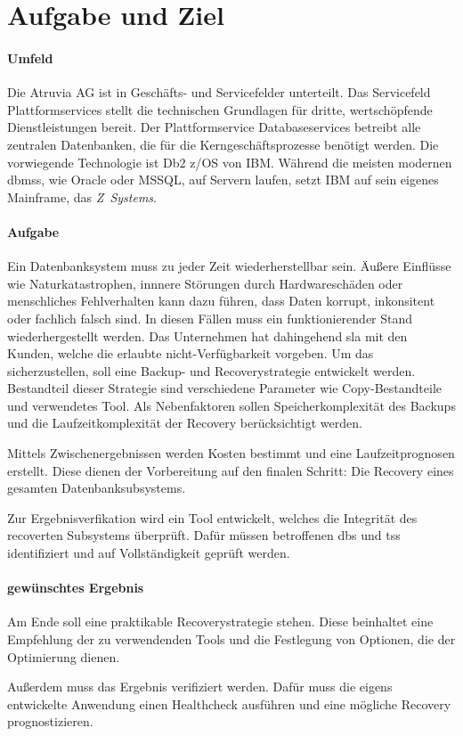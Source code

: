 \chapter{Aufgabe und Ziel}

\subsubsection{Umfeld}
Die Atruvia AG ist in Geschäfts- und Servicefelder unterteilt. Das Servicefeld Plattformservices stellt die technischen Grundlagen für dritte, wertschöpfende Dienstleistungen bereit. Der Plattformservice Databaseservices betreibt alle zentralen Datenbanken, die für die Kerngeschäftsprozesse benötigt werden. Die vorwiegende Technologie ist Db2 z/OS von IBM. Während die meisten modernen \acp{dbms}, wie Oracle oder MSSQL, auf Servern laufen, setzt IBM auf sein eigenes Mainframe, das \emph{\mbox{Z Systems}}. 

\subsubsection{Aufgabe}
Ein Datenbanksystem muss zu jeder Zeit wiederherstellbar sein. Äußere Einflüsse wie Naturkatastrophen, innnere Störungen durch Hardwareschäden oder menschliches Fehlverhalten kann dazu führen, dass Daten korrupt, inkonsitent oder fachlich falsch sind. In diesen Fällen muss ein funktionierender Stand wiederhergestellt werden. Das Unternehmen hat dahingehend \ac{sla} mit den Kunden, welche die erlaubte nicht-Verfügbarkeit vorgeben. Um das sicherzustellen, soll eine Backup- und Recoverystrategie entwickelt werden. Bestandteil dieser Strategie sind verschiedene Parameter wie Copy-Bestandteile und verwendetes Tool. Als Nebenfaktoren sollen Speicherkomplexität des Backups und die Laufzeitkomplexität der Recovery berücksichtigt werden.

Mittels Zwischenergebnissen werden Kosten bestimmt und eine Laufzeitprognosen erstellt. Diese dienen der Vorbereitung auf den finalen Schritt: Die Recovery eines gesamten Datenbanksubsystems.

Zur Ergebnisverfikation wird ein Tool entwickelt, welches die Integrität des recoverten Subsystems überprüft. Dafür müssen betroffenen \acp{db} und \acp{ts} identifiziert und auf Vollständigkeit geprüft werden.



\subsubsection{gewünschtes Ergebnis}
Am Ende soll eine praktikable Recoverystrategie stehen. Diese beinhaltet eine Empfehlung der zu verwendenden Tools und die Festlegung von Optionen, die der Optimierung dienen.

Außerdem muss das Ergebnis verifiziert werden. Dafür muss die eigens entwickelte Anwendung einen Healthcheck ausführen und eine mögliche Recovery prognostizieren.